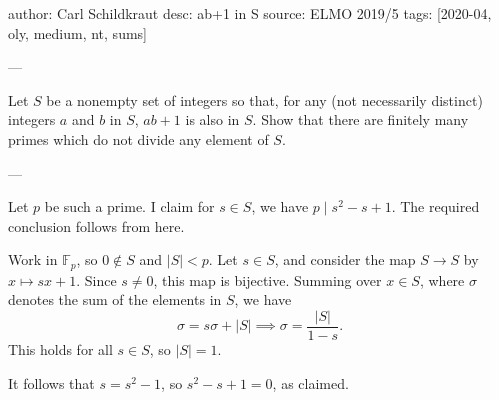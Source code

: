 author: Carl Schildkraut
desc: ab+1 in S
source: ELMO 2019/5
tags: [2020-04, oly, medium, nt, sums]

---

Let $S$ be a nonempty set of integers so that, for any (not necessarily distinct) integers $a$ and $b$ in $S$, $ab+1$ is also in $S$. Show that there are finitely many primes which do not divide any element of $S$.

---

Let $p$ be such a prime. I claim for $s\in S$, we have $p\mid s^2-s+1$. The required conclusion follows from here.

Work in $\mathbb F_p$, so $0\notin S$ and $|S|<p$. Let $s\in S$, and consider the map $S\to S$ by $x\mapsto sx+1$. Since $s\ne0$, this map is bijective. Summing over $x\in S$, where $\sigma$ denotes the sum of the elements in $S$, we have \[\sigma=s\sigma+|S|\implies \sigma=\frac{|S|}{1-s}.\]
This holds for all $s\in S$, so $|S|=1$.

It follows that $s=s^2-1$, so $s^2-s+1=0$, as claimed.
